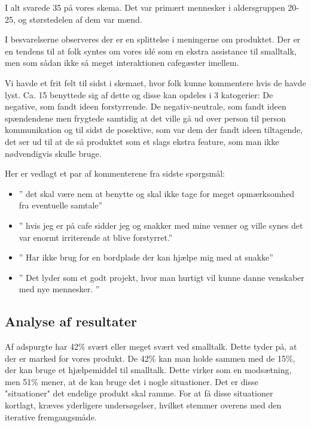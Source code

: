 \documentclass{article}
\begin{document}
    I alt svarede 35 på vores skema. Det var primært mennesker i aldersgruppen 20-25, og størstedelen af dem var mænd.
    
    I besvarelserne observeres der er en splittelse i meningerne om produktet. Der er en tendens til at folk syntes om vores idé som en ekstra assistance til smalltalk, men som sådan ikke så meget interaktionen cafegæster imellem.
    
    Vi havde et frit felt til sidst i skemaet, hvor folk kunne kommentere hvis de havde lyst. Ca. 15 benyttede sig af dette og disse kan opdeles i 3 katogerier: De negative, som fandt ideen forstyrrende. De negativ-neutrale, som fandt ideen spændendene men frygtede samtidig at det ville gå ud over person til person kommunikation og til sidst de posektive, som var dem der fandt ideen tiltagende, det ser ud til at de så produktet som et slags ekstra feature, som man ikke nødvendigvis skulle bruge.
    
    Her er vedlagt et par af kommenterene fra sidste spørgsmål:
\begin{itemize}
    
    \item ” det skal være nem at benytte og skal ikke tage for meget opmærksomhed fra eventuelle samtale”
    \item ” hvis jeg er på cafe sidder jeg og snakker med mine venner og ville synes det var enormt irriterende at blive forstyrret.”
    \item ” Har ikke brug for en bordplade der kan hjælpe mig med at snakke”
    \item ” Det lyder som et godt projekt, hvor man hurtigt vil kunne danne venskaber med nye mennesker. ”
    
\end{itemize}
    
\subsection{Analyse af resultater}
    Af adspurgte har 42\% svært eller meget svært ved smalltalk. Dette tyder på, at der er marked for vores produkt. De 42\% kan man holde sammen med de 15\%, der kan bruge et hjælpemiddel til smalltalk. Dette virker som en modsætning, men 51\% mener, at de kan bruge det i nogle situationer. Det er disse "situationer" det endelige produkt skal ramme. For at få disse situationer kortlagt, kræves yderligere undersøgelser, hvilket stemmer overens med den iterative fremgangsmåde.
    
\end{document}
